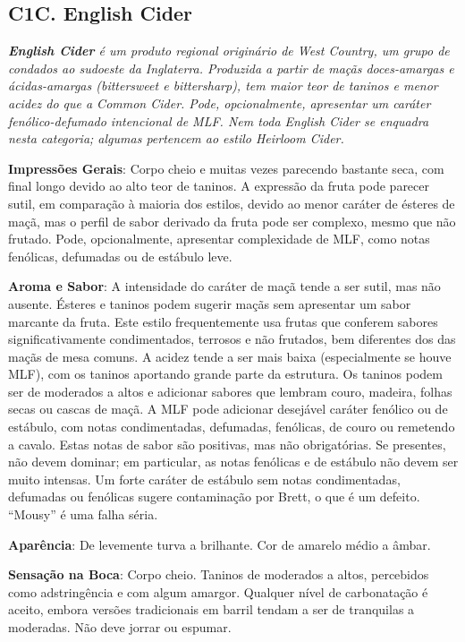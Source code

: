 \subsection*{C1C. English Cider}

\textit{\textbf{English Cider} é um produto regional originário de West Country, um grupo de condados ao sudoeste da Inglaterra. Produzida a partir de maçãs doces-amargas e ácidas-amargas (\textit{bittersweet} e \textit{bittersharp}), tem maior teor de taninos e menor acidez do que a Common Cider. Pode, opcionalmente, apresentar um caráter fenólico-defumado intencional de MLF. Nem toda English Cider se enquadra nesta categoria; algumas pertencem ao estilo Heirloom Cider.}

\textbf{Impressões Gerais}: Corpo cheio e muitas vezes parecendo bastante seca, com final longo devido ao alto teor de taninos. A expressão da fruta pode parecer sutil, em comparação à maioria dos estilos, devido ao menor caráter de ésteres de maçã, mas o perfil de sabor derivado da fruta pode ser complexo, mesmo que não frutado. Pode, opcionalmente, apresentar complexidade de MLF, como notas fenólicas, defumadas ou de estábulo leve.

\textbf{Aroma e Sabor}: A intensidade do caráter de maçã tende a ser sutil, mas não ausente. Ésteres e taninos podem sugerir maçãs sem apresentar um sabor marcante da fruta. Este estilo frequentemente usa frutas que conferem sabores significativamente condimentados, terrosos e não frutados, bem diferentes dos das maçãs de mesa comuns. A acidez tende a ser mais baixa (especialmente se houve MLF), com os taninos aportando grande parte da estrutura. Os taninos podem ser de moderados a altos e adicionar sabores que lembram couro, madeira, folhas secas ou cascas de maçã. A MLF pode adicionar desejável caráter fenólico ou de estábulo, com notas condimentadas, defumadas, fenólicas, de couro ou remetendo a cavalo. Estas notas de sabor são positivas, mas não obrigatórias. Se presentes, não devem dominar; em particular, as notas fenólicas e de estábulo não devem ser muito intensas. Um forte caráter de estábulo sem notas condimentadas, defumadas ou fenólicas sugere contaminação por Brett, o que é um defeito. “Mousy” é uma falha séria.

\textbf{Aparência}: De levemente turva a brilhante. Cor de amarelo médio a âmbar.

\textbf{Sensação na Boca}: Corpo cheio. Taninos de moderados a altos, percebidos como adstringência e com algum amargor. Qualquer nível de carbonatação é aceito, embora versões tradicionais em barril tendam a ser de tranquilas a moderadas. Não deve jorrar ou espumar.

